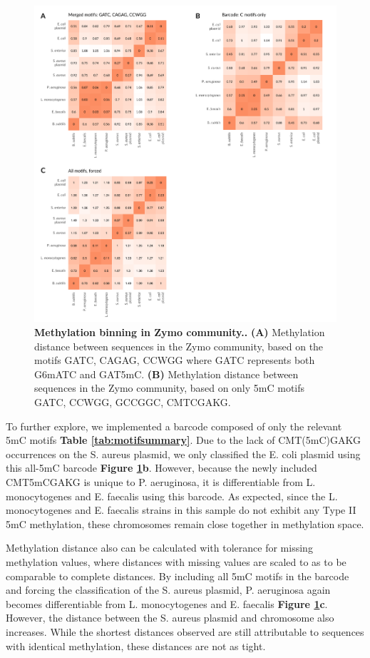 \begin{figure}[!hb]
\centering
\includegraphics[width = 1\linewidth,keepaspectratio]{figure/zheatmaps.pdf}
\caption[Methylation binning in Zymo community.]{{\bf Methylation binning in Zymo community..} {\bf (A)} Methylation distance between sequences in the Zymo community, based on the motifs GATC, CAGAG, CCWGG where GATC represents both G6mATC and GAT5mC. {\bf (B)} Methylation distance between sequences in the Zymo community, based on only 5mC motifs GATC, CCWGG, GCCGGC, CMTCGAKG. }
\label{fig:zheatmaps}
\end{figure}


To further explore, we implemented a barcode composed of only the relevant 5mC motifs {\bf Table \ref{tab:motifsummary}}. Due to the lack of CMT(5mC)GAKG occurrences on the S. aureus plasmid, we only classified the E. coli plasmid using this all-5mC barcode {\bf Figure \ref{fig:zheatmaps}b}. However, because the newly included CMT5mCGAKG is unique to P. aeruginosa, it is differentiable from L. monocytogenes and E. faecalis using this barcode. As expected, since the L. monocytogenes and E. faecalis strains in this sample do not exhibit any Type II 5mC methylation, these chromosomes remain close together in methylation space.

Methylation distance also can be calculated with tolerance for missing methylation values, where distances with missing values are scaled to as to be comparable to complete distances. By including all 5mC motifs in the barcode and forcing the classification of the S. aureus plasmid, P. aeruginosa again becomes differentiable from L. monocytogenes and E. faecalis {\bf Figure \ref{fig:zheatmaps}c}. However, the distance between the S. aureus plasmid and chromosome also increases. While the shortest distances observed are still attributable to sequences with identical methylation, these distances are not as tight.

